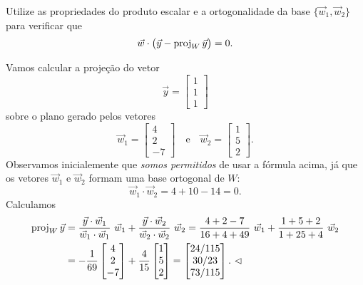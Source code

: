 \documentclass[../livro.tex]{subfiles}  %
\begin{document}
\begin{exercise}\label{exercise:proj}
Utilize as propriedades do produto escalar e a ortogonalidade da base $\{\vec{w}_1, \vec{w}_2\}$ para verificar que
\begin{equation}
\vec{w} \cdot  \big( \vec{y} - \operatorname{proj}_W \vec{y} \big) = 0.
\end{equation}
\end{exercise}

\begin{example}
Vamos calcular a projeção do vetor
\begin{equation}
\vec{y} =
\begin{bmatrix}
 1\\1\\1
\end{bmatrix}
\end{equation} sobre o plano gerado pelos vetores
\begin{equation}
\vec{w}_1 =
\begin{bmatrix}
 4\\2\\-7
\end{bmatrix} \quad \text{e} \quad
\vec{w}_2 =
\begin{bmatrix}
 1\\5\\2
\end{bmatrix}.
\end{equation} Observamos inicialemente que \textit{somos permitidos} de usar a fórmula acima, já que os vetores $\vec{w}_1$ e $\vec{w}_2$ formam uma base ortogonal de $W$:
\begin{equation}
\vec{w}_1 \cdot \vec{w}_2 = 4 + 10 -14 = 0.
\end{equation} Calculamos
  \begin{align*}
\operatorname{proj}_W \vec{y} & = \frac{\vec{y} \cdot \vec{w}_1}{\vec{w}_1 \cdot \vec{w}_1} \ \vec{w}_1 + \frac{\vec{y} \cdot \vec{w}_2}{\vec{w}_2 \cdot \vec{w}_2} \ \vec{w}_2 = \frac{4 + 2 -7}{16 + 4 + 49} \ \vec{w}_1 + \frac{1 + 5 + 2}{1+25+4} \ \vec{w}_2 \\
                & = -\frac{1}{69}
                \begin{bmatrix}
 4\\2\\-7
\end{bmatrix}
                + \frac{4}{15}
\begin{bmatrix}
 1\\5\\2
\end{bmatrix} =
\begin{bmatrix}
 24/115 \\ 30/23 \\ 73/115
\end{bmatrix}. \ \lhd
  \end{align*}
\end{example}
\end{document}
